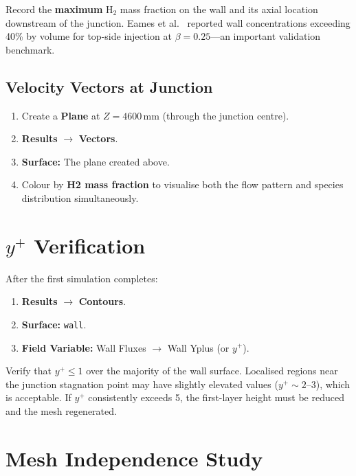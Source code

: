 \documentclass[12pt,a4paper]{report}
\begin{document}
\noindent Record the \textbf{maximum} H$_2$ mass fraction on the wall
and its axial location downstream of the junction.  Eames et
al.~\cite{Eames2022} reported wall concentrations exceeding 40\% by
volume for top-side injection at $\beta = 0.25$---an important
validation benchmark.


\subsection{Velocity Vectors at Junction}

\begin{enumerate}
  \item Create a \textbf{Plane} at $Z = 4600$\,mm (through the junction
        centre).
  \item \textbf{Results} $\rightarrow$ \textbf{Vectors}.
  \item \textbf{Surface:} The plane created above.
  \item Colour by \textbf{H2 mass fraction} to visualise both the
        flow pattern and species distribution simultaneously.
\end{enumerate}


\section[y+ Verification]{\texorpdfstring{$y^+$}{y+} Verification}

After the first simulation completes:

\begin{enumerate}
  \item \textbf{Results} $\rightarrow$ \textbf{Contours}.
  \item \textbf{Surface:} \texttt{wall}.
  \item \textbf{Field Variable:} Wall Fluxes $\rightarrow$
        Wall Yplus (or $y^+$).
\end{enumerate}

\noindent Verify that $y^+ \leq 1$ over the majority of the wall
surface.  Localised regions near the junction stagnation point may
have slightly elevated values ($y^+ \sim 2$--3), which is acceptable.
If $y^+$ consistently exceeds 5, the first-layer height must be reduced
and the mesh regenerated.


\section{Mesh Independence Study}
\label{sec:meshindep}
\end{document}

